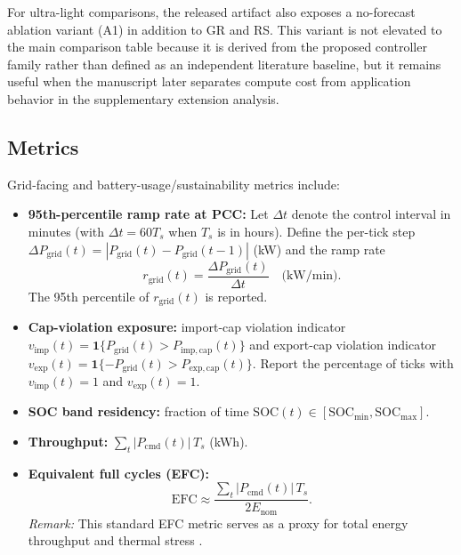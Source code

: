 \documentclass[preprint,12pt]{elsarticle}
\def\texttt#1{#1}%
\newcommand{\SOC}{\mathrm{SOC}}
\newcommand{\Pcmd}{P_{\mathrm{cmd}}}
\newcommand{\Pgrid}{P_{\mathrm{grid}}}
\newcommand{\EFC}{\mathrm{EFC}}
\newcommand{\Ts}{T_s}
\begin{document}
For ultra-light comparisons, the released artifact also exposes a no-forecast ablation variant (\texttt{A1}) in addition to GR and RS. This variant is not elevated to the main comparison table because it is derived from the proposed controller family rather than defined as an independent literature baseline, but it remains useful when the manuscript later separates compute cost from application behavior in the supplementary extension analysis.

\subsection{Metrics}
Grid-facing and battery-usage/sustainability metrics include:
\begin{itemize}
\item \textbf{95th-percentile ramp rate at PCC:} Let $\Delta t$ denote the control interval in minutes (with $\Delta t=60\Ts$ when $\Ts$ is in hours). Define the per-tick step $\Delta P_{\mathrm{grid}}(t)=|\Pgrid(t)-\Pgrid(t-1)|$ (kW) and the ramp rate
\begin{equation}
r_{\mathrm{grid}}(t)=\frac{\Delta P_{\mathrm{grid}}(t)}{\Delta t}\quad \text{(kW/min)}.
\end{equation}
The 95th percentile of $r_{\mathrm{grid}}(t)$ is reported.

\item \textbf{Cap-violation exposure:}
import-cap violation indicator $v_{\mathrm{imp}}(t)=\mathbf{1}\{\Pgrid(t)>P_{\mathrm{imp,cap}}(t)\}$ and
export-cap violation indicator $v_{\mathrm{exp}}(t)=\mathbf{1}\{-\Pgrid(t)>P_{\mathrm{exp,cap}}(t)\}$.
Report the percentage of ticks with $v_{\mathrm{imp}}(t)=1$ and $v_{\mathrm{exp}}(t)=1$.

\item \textbf{SOC band residency:} fraction of time $\SOC(t)\in[\SOC_{\min},\SOC_{\max}]$.

\item \textbf{Throughput:} $\sum_t |\Pcmd(t)|\,\Ts$ (kWh).

\item \textbf{Equivalent full cycles (EFC):}
\begin{equation}
\EFC \approx \frac{\sum_t |\Pcmd(t)|\,\Ts}{2E_{\mathrm{nom}}}.
\label{eq:efc}
\end{equation}
\textit{Remark:} This standard EFC metric serves as a proxy for total energy throughput and thermal stress \cite{hoke2014accounting}.


\end{itemize}
\end{document}
